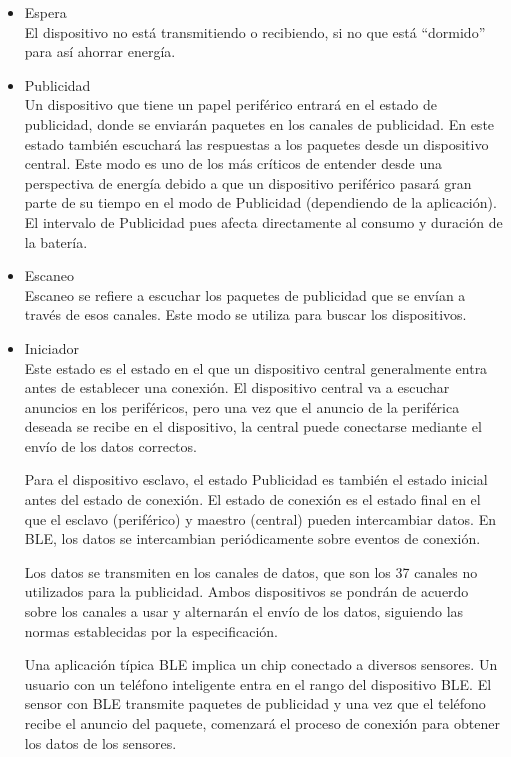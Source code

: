 \begin{itemize}
\item Espera \\ El dispositivo no está transmitiendo o recibiendo, si no que está ``dormido'' para así ahorrar energía.
\item Publicidad \\ Un dispositivo que tiene un papel periférico entrará en el estado de publicidad, donde se enviarán paquetes en los canales de publicidad. En este estado también escuchará las respuestas a los paquetes desde un dispositivo central. Este modo es uno de los más críticos de entender desde una perspectiva de energía debido a que un dispositivo periférico pasará gran parte de su tiempo en el modo de Publicidad (dependiendo de la aplicación). El intervalo de Publicidad pues afecta directamente al consumo y duración de la batería.
\item Escaneo \\  Escaneo se refiere a escuchar los paquetes de publicidad que se envían a través de esos canales. Este modo se utiliza para buscar los dispositivos.
\item Iniciador \\ Este estado es el estado en el que un dispositivo central generalmente entra antes de establecer una conexión. El dispositivo central va a escuchar anuncios en los periféricos, pero una vez que el anuncio de la periférica deseada se recibe en el dispositivo, la central puede conectarse mediante el envío de los datos correctos.

Para el dispositivo esclavo, el estado Publicidad es también el estado inicial antes del estado de conexión. El estado de conexión es el estado final en el que el esclavo (periférico) y maestro (central) pueden intercambiar datos.
En \ac{BLE}, los datos se intercambian periódicamente sobre eventos de conexión.

Los datos se transmiten en los canales de datos, que son los 37 canales no utilizados para la publicidad. Ambos dispositivos se pondrán de acuerdo sobre los canales a usar y alternarán el envío de los datos, siguiendo las normas establecidas por la especificación.

Una aplicación típica \ac{BLE} implica un chip conectado a diversos sensores. Un usuario con un teléfono inteligente entra en el rango del dispositivo \ac{BLE}. El sensor con BLE transmite paquetes de publicidad y una vez que el teléfono recibe el anuncio del paquete, comenzará el proceso de conexión para obtener los datos de los sensores.

\end{itemize}

